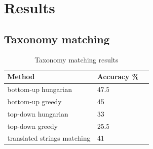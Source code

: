 \documentclass[11pt,a4paper]{article}
\begin{document}
\section{Results}

\subsection{Taxonomy matching}
        \begin{table}[!htbp]
        \small
        \caption{Taxonomy matching results}
        \label{table-taxonomies-results}
        \centering
        \begin{tabular}{|l|l|l|}
        \hline
        {Method} & {Accuracy \%} \\ \hline
        bottom-up hungarian & 47.5 \\ \hline
        bottom-up greedy & 45 \\ \hline
        top-down hungarian & 33 \\ \hline
        top-down greedy & 25.5 \\ \hline
        translated strings matching & 41 \\
        \hline
        \end{tabular}
\end{table}
\end{document}
